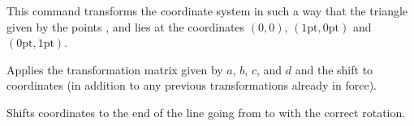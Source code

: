   

\begin{command}{\pgftransformtriangle{}}
  This command transforms the coordinate system in such a way that the
  triangle given by the points ,  and  lies at
  the coordinates $(0,0)$, $(1\mathrm{pt},0\mathrm{pt})$ and
  $(0\mathrm{pt},1\mathrm{pt})$. 
\begin{codeexample}[]
\end{codeexample}
\end{command}

  
\begin{command}{\pgftransformcm{}}
  Applies the transformation matrix given by $a$, $b$, $c$, and $d$
  and the shift  to coordinates (in addition to any
  previous transformations already in force).
\begin{codeexample}[]
\end{codeexample}
\end{command}

  
\begin{command}{\pgftransformarrow{}}
  Shifts coordinates to the end of the line going from  
  to  with the correct rotation. 
\begin{codeexample}[]
\end{codeexample}
\end{command}

